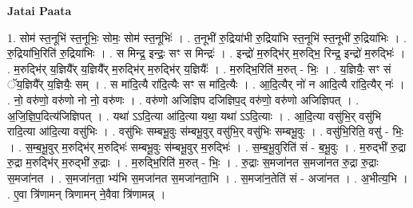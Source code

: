 \documentclass[17pt]{extarticle}
\begin{document}
\textbf{Jatai Paata} \newline

1. सोम॑ स्त॒नूभि॑ स्त॒नूभिः॒ सोमः॒ सोम॑ स्त॒नूभिः॑ । . त॒नूभी॑ रु॒द्रिया॑भी रु॒द्रिया॑भि स्त॒नूभि॑ स्त॒नूभी॑ रु॒द्रिया॑भिः । . रु॒द्रिया॑भि॒रिति॑ रु॒द्रिया॑भिः । . स मिन्द्र॒ इन्द्रः॒ सꣳ स मिन्द्रः॑ । . इन्द्रो॑ म॒रुद्भि॑र् म॒रुद्भि॒ रिन्द्र॒ इन्द्रो॑ म॒रुद्भिः॑ । . म॒रुद्भि॑र् य॒ज्ञियै᳚र् य॒ज्ञियै᳚र् म॒रुद्भि॑र् म॒रुद्भि॑र् य॒ज्ञियैः᳚ । . म॒रुद्भि॒रिति॑ म॒रुत् - भिः॒ । . य॒ज्ञियैः॒ सꣳ सं ॅय॒ज्ञियै᳚र् य॒ज्ञियैः॒ सम् । . स मा॑दि॒त्यै रा॑दि॒त्यैः सꣳ स मा॑दि॒त्यैः । . आ॒दि॒त्यैर् नो॑ न आदि॒त्यै रा॑दि॒त्यैर् नः॑ । . नो॒ वरु॑णो॒ वरु॑णो नो नो॒ वरु॑णः । . वरु॑णो अजिज्ञिप दजिज्ञिप॒द् वरु॑णो॒ वरु॑णो अजिज्ञिपत् । . अ॒जि॒ज्ञि॒प॒दित्य॑जिज्ञिपत् । . यथा॑ ऽऽदि॒त्या आ॑दि॒त्या यथा॒ यथा॑ ऽऽदि॒त्याः । . आ॒दि॒त्या वसु॑भि॒र् वसु॑भि रादि॒त्या आ॑दि॒त्या वसु॑भिः । . वसु॑भिः सम्बभू॒वुः स॑म्बभू॒वुर् वसु॑भि॒र् वसु॑भिः सम्बभू॒वुः । . वसु॑भि॒रिति॒ वसु॑ - भिः॒ । . स॒म्ब॒भू॒वुर् म॒रुद्भि॑र् म॒रुद्भिः॑ सम्बभू॒वुः स॑म्बभू॒वुर् म॒रुद्भिः॑ । . स॒म्ब॒भू॒वुरिति॑ सं - ब॒भू॒वुः । . म॒रुद्भी॑ रु॒द्रा रु॒द्रा म॒रुद्भि॑र् म॒रुद्भी॑ रु॒द्राः । . म॒रुद्भि॒रिति॑ म॒रुत् - भिः॒ । . रु॒द्राः स॒मजा॑नत स॒मजा॑नत रु॒द्रा रु॒द्राः स॒मजा॑नत । . स॒मजा॑नता॒ भ्य॑भि स॒मजा॑नत स॒मजा॑नता॒भि । . स॒मजा॑न॒तेति॑ सं - अजा॑नत । . अ॒भीत्य॒भि । . ए॒वा त्रि॑णामन् त्रिणामन् ने॒वैवा त्रि॑णामन्न् । \newline
\end{document}
